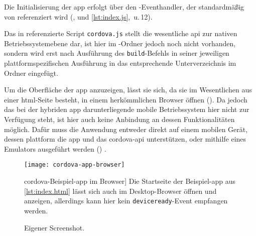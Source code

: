 {Die Initialisierung der \gls{app} erfolgt über den -Eventhandler, der standardmäßig von  referenziert wird (,  und \autoref{lst:index.js}, \,u.\,12).

Das in  referenzierte Script \lstinline|cordova.js| stellt die \og wesentliche \gls{api} zur nativen Betriebssystemebene dar, ist hier im -Ordner jedoch noch nicht vorhanden, sondern wird erst nach Ausführung des \lstinline|build|-Befehls in seiner jeweiligen plattformspezifischen Ausführung in das entsprechende Unterverzeichnis im Ordner  eingefügt. 

\par\noindent\begin{minipage}{\linewidth}

\end{minipage}\par\addvspace{\topskip}


\par\noindent\begin{minipage}{\linewidth}

\end{minipage}\par\addvspace{\topskip}

Um die Oberfläche der \gls{app} anzuzeigen, lässt sie sich, da sie im Wesentlichen aus einer \gls{html}-Seite besteht, in einem herkömmlichen Browser öffnen ().
Da jedoch das bei der hybriden \gls{app} darunterliegende mobile Betriebssystem hier nicht zur Verfügung steht, ist hier auch keine Anbindung an dessen Funktionalitäten möglich.
Dafür muss die Anwendung entweder direkt auf einem mobilen Gerät, dessen \gls{plattform} die \gls{app} und das \gls{cordova}-\gls{api} unterstützen, oder mithilfe eines Emulators ausgeführt werden () \cite{Cordova-Docs_CLI}.

\begin{figure}[h!]
\centering
\texttt{[image: cordova-app-browser]}
	\caption
	[\gls{cordova}-Beispiel-\gls{app} im Browser]
	{Die Startseite der Beispiel-\gls{app} aus \autoref{lst:index.html} lässt sich auch im Desktop-Browser öffnen und anzeigen, allerdings kann hier kein \lstinline|deviceready|-Event empfangen werden.}
	\label{fig:cordova-app-browser}
		\imagesourcefont
		\vspace{\imagesourcespace}
		\imagesourcefont{}
		\caption*{\imagesourcelabel Eigener Screenshot.}
\end{figure}

}
